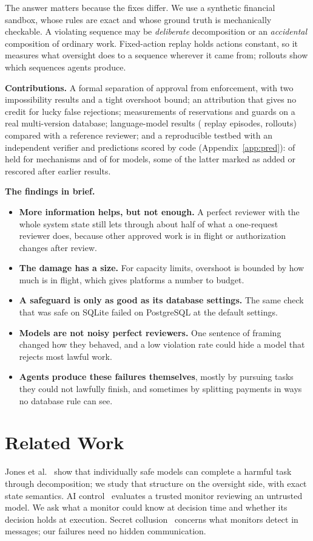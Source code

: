 \documentclass[10pt]{article}
\begin{document}
The answer matters because the fixes differ. We use a synthetic financial sandbox, whose rules are exact and whose ground truth is mechanically checkable. A violating sequence may be \emph{deliberate} decomposition or an \emph{accidental} composition of ordinary work. Fixed-action replay holds actions constant, so it measures what oversight does to a sequence wherever it came from; rollouts show which sequences agents produce.

\textbf{Contributions.} A formal separation of approval from enforcement, with two impossibility results and a tight overshoot bound; an attribution that gives no credit for lucky false rejections; measurements of reservations and guards on a real multi-version database; language-model results (\nLlmFixedEpisodes{} replay episodes, \nLlmRollouts{} rollouts) compared with a reference reviewer; and a reproducible testbed with an independent verifier and predictions scored by code (Appendix~\ref{app:pred}): \predHeld{} of \predTotal{} held for mechanisms and \predLlmHeld{} of \predLlmTotal{} for models, some of the latter marked as added or rescored after earlier results.

\textbf{The findings in brief.}
\begin{itemize}
\item \textbf{More information helps, but not enough.} A perfect reviewer with the whole system state still lets through about half of what a one-request reviewer does, because other approved work is in flight or authorization changes after review.
\item \textbf{The damage has a size.} For capacity limits, overshoot is bounded by how much is in flight, which gives platforms a number to budget.
\item \textbf{A safeguard is only as good as its database settings.} The same check that was safe on SQLite failed on PostgreSQL at the default settings.
\item \textbf{Models are not noisy perfect reviewers.} One sentence of framing changed how they behaved, and a low violation rate could hide a model that rejects most lawful work.
\item \textbf{Agents produce these failures themselves}, mostly by pursuing tasks they could not lawfully finish, and sometimes by splitting payments in ways no database rule can see.
\end{itemize}

\section{Related Work}
Jones et al.~\cite{jones2024} show that individually safe models can complete a harmful task through decomposition; we study that structure on the oversight side, with exact state semantics. AI control~\cite{greenblatt2023} evaluates a trusted monitor reviewing an untrusted model. We ask what a monitor could know at decision time and whether its decision holds at execution. Secret collusion~\cite{motwani2024} concerns what monitors detect in messages; our failures need no hidden communication.
\end{document}
